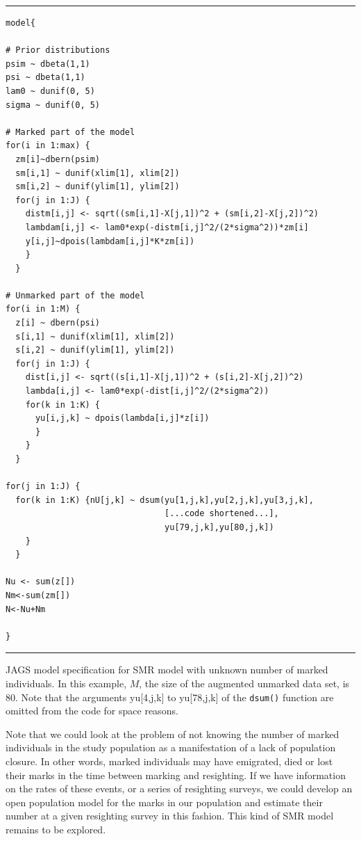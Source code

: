 \begin{panel}[htp]
\centering
\rule[0.15in]{\textwidth}{.03in}
{\small
\begin{verbatim}
model{

# Prior distributions
psim ~ dbeta(1,1)
psi ~ dbeta(1,1)
lam0 ~ dunif(0, 5)
sigma ~ dunif(0, 5)

# Marked part of the model
for(i in 1:max) {
  zm[i]~dbern(psim)
  sm[i,1] ~ dunif(xlim[1], xlim[2])
  sm[i,2] ~ dunif(ylim[1], ylim[2])
  for(j in 1:J) {
    distm[i,j] <- sqrt((sm[i,1]-X[j,1])^2 + (sm[i,2]-X[j,2])^2)
    lambdam[i,j] <- lam0*exp(-distm[i,j]^2/(2*sigma^2))*zm[i]
    y[i,j]~dpois(lambdam[i,j]*K*zm[i])
    }
  }

# Unmarked part of the model
for(i in 1:M) {
  z[i] ~ dbern(psi)
  s[i,1] ~ dunif(xlim[1], xlim[2])
  s[i,2] ~ dunif(ylim[1], ylim[2])
  for(j in 1:J) {
    dist[i,j] <- sqrt((s[i,1]-X[j,1])^2 + (s[i,2]-X[j,2])^2)
    lambda[i,j] <- lam0*exp(-dist[i,j]^2/(2*sigma^2))
    for(k in 1:K) {
      yu[i,j,k] ~ dpois(lambda[i,j]*z[i])
      }
    }
  }

for(j in 1:J) {
  for(k in 1:K) {nU[j,k] ~ dsum(yu[1,j,k],yu[2,j,k],yu[3,j,k],
								[...code shortened...],
								yu[79,j,k],yu[80,j,k])
	}
  }

Nu <- sum(z[])
Nm<-sum(zm[])
N<-Nu+Nm

}
\end{verbatim}
}
\rule[-0.15in]{\textwidth}{.03in}
\caption{
JAGS model specification for SMR model with unknown number of marked individuals. In this example, $M$, the size of the augmented unmarked data set, is 80. Note that the arguments yu[4,j,k] to yu[78,j,k] of the {\tt dsum()} function are omitted from the code for space reasons.
}
\label{partialID.panel.unknownm}
\end{panel}



Note that we could look at the problem of not knowing the number of
marked individuals in the study population as a manifestation of a
lack of population closure. In other words, marked individuals may
have emigrated, died or lost their marks in the time between marking
and resighting. If we have information on the rates of these events,
or a series of resighting surveys, we could develop an open population
model for the marks in our population and estimate their number at a
given resighting survey in this fashion. This kind of SMR model
remains to be explored.


